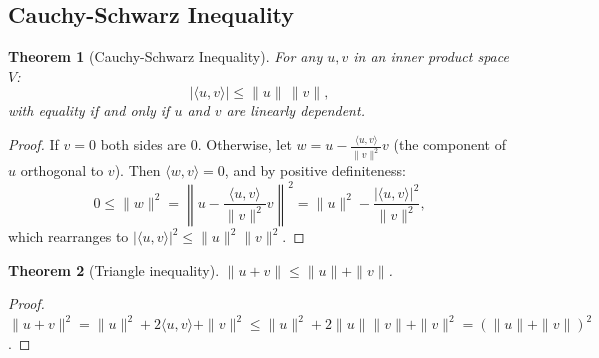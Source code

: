 \documentclass{article}
\newtheorem{theorem}{Theorem}
\begin{document}
\subsection{Cauchy-Schwarz Inequality}
\begin{theorem}[Cauchy-Schwarz Inequality]
    For any $u, v$ in an inner product space $V$:
    \[|\langle u, v \rangle| \leq \|u\|\,\|v\|,\]
    with equality if and only if $u$ and $v$ are linearly dependent.
\end{theorem}
\begin{proof}
    If $v = 0$ both sides are 0. Otherwise, let $w = u - \frac{\langle u,v\rangle}{\|v\|^2}v$ (the component of $u$ orthogonal to $v$). Then $\langle w, v\rangle = 0$, and by positive definiteness:
    \[0 \leq \|w\|^2 = \left\|u - \frac{\langle u,v\rangle}{\|v\|^2}v\right\|^2 = \|u\|^2 - \frac{|\langle u,v\rangle|^2}{\|v\|^2},\]
    which rearranges to $|\langle u,v\rangle|^2 \leq \|u\|^2\|v\|^2$.
\end{proof}
\begin{theorem}[Triangle inequality]
    $\|u+v\| \leq \|u\| + \|v\|$.
\end{theorem}
\begin{proof}
    $\|u+v\|^2 = \|u\|^2 + 2\langle u,v\rangle + \|v\|^2 \leq \|u\|^2 + 2\|u\|\|v\| + \|v\|^2 = (\|u\|+\|v\|)^2$.
\end{proof}
\end{document}
